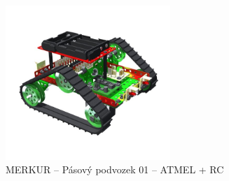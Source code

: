 

\begin{figure}[h]
	\centering
	\includegraphics[width=235px]{images/MERKUR_Pasovy-podvozek-01_ATMEL+RC.jpg}
	\caption[MERKUR -- Pásový podvozek 01 -- ATMEL + RC]{MERKUR -- Pásový podvozek 01 -- ATMEL + RC\protect\footnotemark}
	\label{fig:MERKUR_Pasovy-podvozek-01_ATMEL+RC}
\end{figure}



